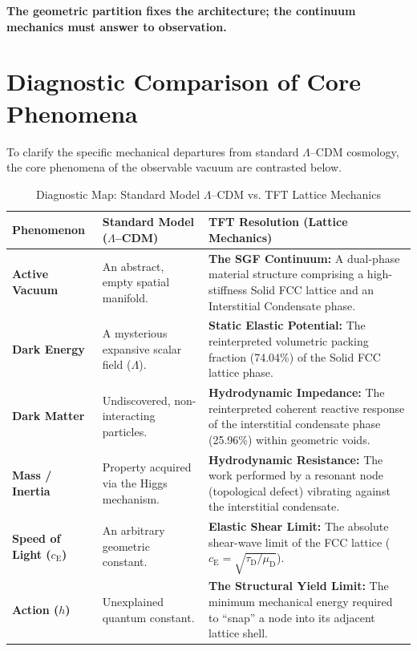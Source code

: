 \medskip
\noindent\textbf{The geometric partition fixes the architecture; the continuum mechanics must answer to observation.}

\section{Diagnostic Comparison of Core Phenomena}
To clarify the specific mechanical departures from standard $\Lambda$--CDM cosmology, the core phenomena of the observable vacuum are contrasted below.

\enlargethispage{2\baselineskip} %
\begin{table}[H]
\centering
\small %
\caption{Diagnostic Map: Standard Model $\Lambda$--CDM vs. TFT Lattice Mechanics}
\label{tab:diagnostic_map}
\renewcommand{\arraystretch}{1.4} %
\begin{tabular}{@{} >{\raggedright\arraybackslash}p{3cm} >{\raggedright\arraybackslash}p{5.5cm} >{\raggedright\arraybackslash}p{6cm} @{} }
\toprule
\textbf{Phenomenon} & \textbf{Standard Model ($\Lambda$--CDM)} & \textbf{TFT Resolution (Lattice Mechanics)} \\
\midrule
\textbf{Active Vacuum} & An abstract, empty spatial manifold. & \textbf{The SGF Continuum:} A dual-phase material structure comprising a high-stiffness Solid FCC lattice and an Interstitial Condensate phase. \\
\textbf{Dark Energy} & A mysterious expansive scalar field ($\Lambda$). & \textbf{Static Elastic Potential:} The reinterpreted volumetric packing fraction (74.04\%) of the Solid FCC lattice phase. \\
\textbf{Dark Matter} & Undiscovered, non-interacting particles. & \textbf{Hydrodynamic Impedance:} The reinterpreted coherent reactive response of the interstitial condensate phase (25.96\%) within geometric voids. \\
\textbf{Mass / Inertia} & Property acquired via the Higgs mechanism. & \textbf{Hydrodynamic Resistance:} The work performed by a resonant node (topological defect) vibrating against the interstitial condensate. \\
\textbf{Speed of Light ($c_{\mathrm{E}}$)} & An arbitrary geometric constant. & \textbf{Elastic Shear Limit:} The absolute shear-wave limit of the FCC lattice ($c_{\mathrm{E}} = \sqrt{\tau_{\mathrm{D}} / \mu_{\mathrm{D}}}$). \\
\textbf{Action ($h$)} & Unexplained quantum constant. & \textbf{The Structural Yield Limit:} The minimum mechanical energy required to ``snap'' a node into its adjacent lattice shell. \\

\end{tabular}
\end{table}
